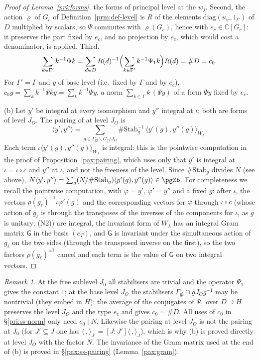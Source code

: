 \documentclass[10pt]{amsart}
\theoremstyle{definition}
\theoremstyle{remark}
\newtheorem{remark}[theorem]{Remark}
\newcommand{\C}{\mathbb C}
\begin{document}
\begin{proof}[Proof of Lemma~\ref{pri:forms}]
the forms of principal level at the $w_j$. Second, the action $\varrho$ of $G_c$ of Definition~\ref{prm:def-level} is
$R$ of the elements $\mathrm{diag}(u_w,1_{t'})$ of $D$ multiplied by scalars, so $\Psi$ commutes with $\varrho(G_c)$, hence
with $e_c\in\C[G_c]$: it preserves the part fixed by $e_c$, and no projection by $e_c$, which would cost a denominator, is applied. Third,
\[
\sum_{k\in\Gamma'}k^{-1}\Psi k=\sum_{d\in D}R(d)^{-1}\Bigl(\sum_{k\in\Gamma'}k^{-1}\Psi_1k\Bigr)R(d)=\#D=c_0 .
\]
For $\Gamma'=\Gamma$ and $y$ of base level (i.e.\ fixed by $\Gamma$ and by $e_c$), $c_0y=\sum_{k}k^{-1}\Psi ky=
\sum_kk^{-1}\Psi y$, a norm $\sum_{k\in\Gamma}k\,(\Psi y)$ of a form $\Psi y$ fixed by $e_c$.

(b) Let $y'$ be integral at every isomorphism and $y''$ integral at $\iota$; both are forms of level
$J_O$. The pairing of {\cite[\S14.3]{P46}} at level $J_O$ is
\[
\langle y',y''\rangle=\sum_{g\in\Gamma_{\mathrm{gl}}\backslash G_f/J_O}\#\mathrm{Stab}_g^{-1}\,
\langle y'(g),y''(g)\rangle_{W_\lambda}.
\]
Each term $\iota\langle y'(g),y''(g)\rangle_{W_\lambda}$ is integral: this is the pointwise computation
in the proof of Proposition~\ref{pax:pairing}, which uses only that $y'$ is integral at $\bar\iota=
\iota\circ c$ and $y''$ at $\iota$, and not the freeness of the level. Since $\#\mathrm{Stab}_g$ divides
$N$ (see above), $N\langle y',y''\rangle=\sum_g(N/\#\mathrm{Stab}_g)\langle y'(g),y''(g)\rangle\in\pgZb$.
For completeness we recall the pointwise computation, with $\varphi=y'$, $\varphi'=y''$ and a fixed
$g$: after $\iota$, the vectors $\rho(g_\ell)^{-1}\iota\varphi'(g)$ and the corresponding
vectors for $\varphi$ through $\iota\circ c$ (whose action of $g_\ell$ is through the transposes of
the inverses of the components for $\iota$, as $g$ is unitary; (N2)) are integral, the invariant form
of $W_\lambda$ has an integral Gram matrix $\mathsf G$ in the basis $(e_T)$, and $\mathsf G$ is
invariant under the simultaneous action of $g_\ell$ on the two sides (through the transposed inverse
on the first), so the two factors $\rho(g_\ell)^{\pm1}$ cancel and each term is the value of
$\mathsf G$ on two integral vectors.
\end{proof}

\begin{remark}\label{pax:rem-forms}
At the free sublevel $J_0$ all stabilisers are trivial and the operator $\Psi_1$ gives the
constant $1$; at the base level $J_O$ the stabilisers $\Gamma_{\mathrm{gl}}\cap gJ_Og^{-1}$ may be
nontrivial (they embed in $H$); the average of the conjugates of $\Psi_1$ over $D\supseteq H$ preserves the level $J_O$ and the type $e_c$ and gives $c_0=\#D$. All uses of $c_0$ in
\S\ref{pri:ss-norm} only need $c_0\mid N$. Likewise the pairing at level $J_O$ is not the pairing
at $J_0$ (for $J'\subseteq J$ one has $\langle\,,\rangle_{J'}=[J:J']\langle\,,\rangle_J$), which is why
(b) is proved directly at level $J_O$ with the factor $N$. The invariance of the Gram matrix
used at the end of (b) is proved in \S\ref{pax:ss-pairing} (Lemma~\ref{pax:gram}).
\end{remark}
\end{document}

